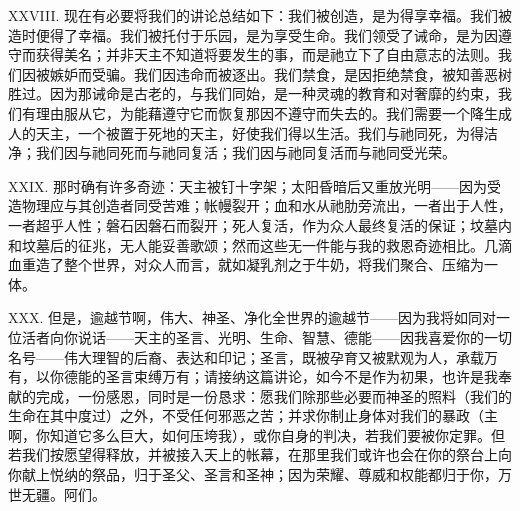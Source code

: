 XXVIII. 现在有必要将我们的讲论总结如下：我们被创造，是为得享幸福。我们被造时便得了幸福。我们被托付于乐园，是为享受生命。我们领受了诫命，是为因遵守而获得美名；并非天主不知道将要发生的事，而是祂立下了自由意志的法则。我们因被嫉妒而受骗。我们因违命而被逐出。我们禁食，是因拒绝禁食，被知善恶树胜过。因为那诫命是古老的，与我们同始，是一种灵魂的教育和对奢靡的约束，我们有理由服从它，为能藉遵守它而恢复那因不遵守而失去的。我们需要一个降生成人的天主，一个被置于死地的天主，好使我们得以生活。我们与祂同死，为得洁净；我们因与祂同死而与祂同复活；我们因与祂同复活而与祂同受光荣。\par

XXIX. 那时确有许多奇迹：天主被钉十字架；太阳昏暗后又重放光明——因为受造物理应与其创造者同受苦难；帐幔裂开；血和水从祂肋旁流出，一者出于人性，一者超乎人性；磐石因磐石而裂开；死人复活，作为众人最终复活的保证；坟墓内和坟墓后的征兆，无人能妥善歌颂；然而这些无一件能与我的救恩奇迹相比。几滴血重造了整个世界，对众人而言，就如凝乳剂之于牛奶，将我们聚合、压缩为一体。\par

XXX. 但是，逾越节啊，伟大、神圣、净化全世界的逾越节——因为我将如同对一位活者向你说话——天主的圣言、光明、生命、智慧、德能——因我喜爱你的一切名号——伟大理智的后裔、表达和印记；圣言，既被孕育又被默观为人，承载万有，以你德能的圣言束缚万有；请接纳这篇讲论，如今不是作为初果，也许是我奉献的完成，一份感恩，同时是一份恳求：愿我们除那些必要而神圣的照料（我们的生命在其中度过）之外，不受任何邪恶之苦；并求你制止身体对我们的暴政（主啊，你知道它多么巨大，如何压垮我），或你自身的判决，若我们要被你定罪。但若我们按愿望得释放，并被接入天上的帐幕，在那里我们或许也会在你的祭台上向你献上悦纳的祭品，归于圣父、圣言和圣神；因为荣耀、尊威和权能都归于你，万世无疆。阿们。\par

